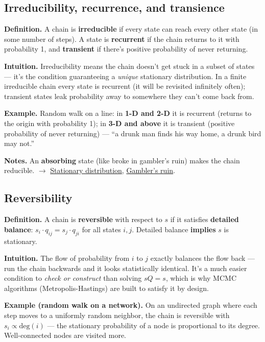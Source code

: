 \documentclass[11pt,a4paper]{article}
\begin{document}
\subsection{Irreducibility, recurrence, and transience}\label{sec:irreducibility-recurrence-and-transience}

\textbf{Definition.} A chain is \textbf{irreducible} if every state can reach every other state (in some number of steps). A state is \textbf{recurrent} if the chain returns to it with probability 1, and \textbf{transient} if there's positive probability of never returning.

\textbf{Intuition.} Irreducibility means the chain doesn't get stuck in a subset of states --- it's the condition guaranteeing a \textit{unique} stationary distribution. In a finite irreducible chain every state is recurrent (it will be revisited infinitely often); transient states leak probability away to somewhere they can't come back from.

\textbf{Example.} Random walk on a line: in \textbf{1-D and 2-D} it is recurrent (returns to the origin with probability 1); in \textbf{3-D and above} it is transient (positive probability of never returning) --- ``a drunk man finds his way home, a drunk bird may not.''

\textbf{Notes.} An \textbf{absorbing} state (like broke in gambler's ruin) makes the chain reducible. $\to$ \hyperref[sec:stationary-distribution]{Stationary distribution}, \hyperref[sec:gamblers-ruin]{Gambler's ruin}.

\subsection{Reversibility}\label{sec:reversibility}

\textbf{Definition.} A chain is \textbf{reversible} with respect to $s$ if it satisfies \textbf{detailed balance}: $s_{i}\cdot q_{ij} = s_{j}\cdot q_{ji}$ for all states $i, j$. Detailed balance \textbf{implies} $s$ is stationary.

\textbf{Intuition.} The flow of probability from $i$ to $j$ exactly balances the flow back --- run the chain backwards and it looks statistically identical. It's a much easier condition to \textit{check or construct} than solving $sQ = s$, which is why MCMC algorithms (Metropolis-Hastings) are built to satisfy it by design.

\textbf{Example (random walk on a network).} On an undirected graph where each step moves to a uniformly random neighbor, the chain is reversible with $s_{i} \propto  \mathrm{deg}(i)$ --- the stationary probability of a node is proportional to its degree. Well-connected nodes are visited more.
\end{document}
